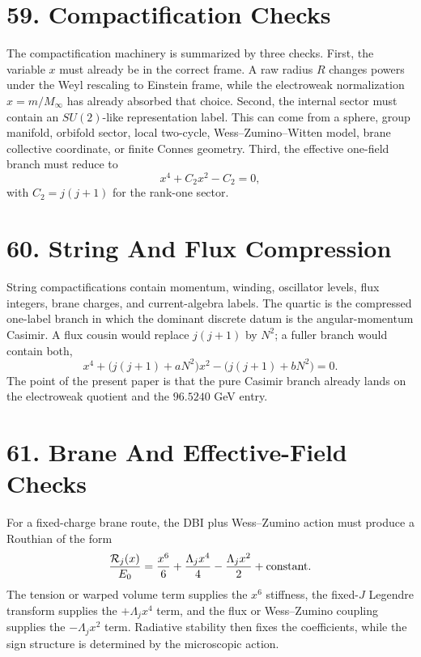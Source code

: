 \documentclass[11pt]{article}
\newcommand{\Lspin}{\Lambda_j}
\begin{document}
\section*{59. Compactification Checks}

The compactification machinery is summarized by three checks. First, the variable \(x\) must already be in the correct frame. A raw radius \(R\) changes powers under the Weyl rescaling to Einstein frame, while the electroweak normalization \(x=m/M_\infty\) has already absorbed that choice. Second, the internal sector must contain an \(SU(2)\)-like representation label. This can come from a sphere, group manifold, orbifold sector, local two-cycle, Wess--Zumino--Witten model, brane collective coordinate, or finite Connes geometry. Third, the effective one-field branch must reduce to
\[
        x^4+C_2x^2-C_2=0,
\]
with \(C_2=j(j+1)\) for the rank-one sector.

\section*{60. String And Flux Compression}

String compactifications contain momentum, winding, oscillator levels, flux integers, brane charges, and current-algebra labels. The quartic is the compressed one-label branch in which the dominant discrete datum is the angular-momentum Casimir. A flux cousin would replace \(j(j+1)\) by \(N^2\); a fuller branch would contain both,
\[
        x^4+\bigl(j(j+1)+aN^2\bigr)x^2
        -\bigl(j(j+1)+bN^2\bigr)=0 .
\]
The point of the present paper is that the pure Casimir branch already lands on the electroweak quotient and the \(96.5240\) GeV entry.

\section*{61. Brane And Effective-Field Checks}

For a fixed-charge brane route, the DBI plus Wess--Zumino action must produce a Routhian of the form
\[
        \frac{\mathcal{R}_j(x)}{E_0}
        =
        \frac{x^6}{6}
        +\frac{\Lspin x^4}{4}
        -\frac{\Lspin x^2}{2}
        +{\rm constant}.
\]
The tension or warped volume term supplies the \(x^6\) stiffness, the fixed-\(J\) Legendre transform supplies the \(+\Lspin x^4\) term, and the flux or Wess--Zumino coupling supplies the \(-\Lspin x^2\) term. Radiative stability then fixes the coefficients, while the sign structure is determined by the microscopic action.
\end{document}
